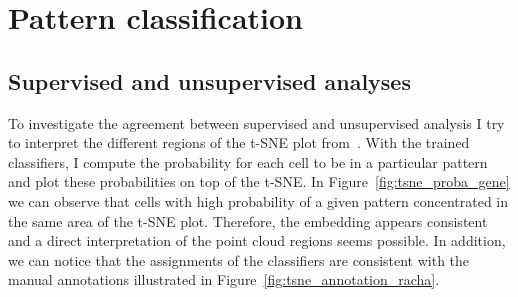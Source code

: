 
\graphicspath{{../../figures/appendix/}}

\chapter{Pattern classification}
\label{ch:cell_pattern_classification}

\newpage

\section{Supervised and unsupervised analyses}
\label{sec:consistency_analysis}

To investigate the agreement between supervised and unsupervised analysis I try to interpret the different regions of the \ac{t-SNE} plot from~\cite{CHOUAIB_2020}.
With the trained classifiers, I compute the probability for each cell to be in a particular pattern and plot these probabilities on top of the \ac{t-SNE}.
In Figure~\ref{fig:tsne_proba_gene} we can observe that cells with high probability of a given pattern concentrated in the same area of the \ac{t-SNE} plot.
Therefore, the embedding appears consistent and a direct interpretation of the point cloud regions seems possible.
In addition, we can notice that the assignments of the classifiers are consistent with the manual annotations illustrated in Figure~\ref{fig:tsne_annotation_racha}.

